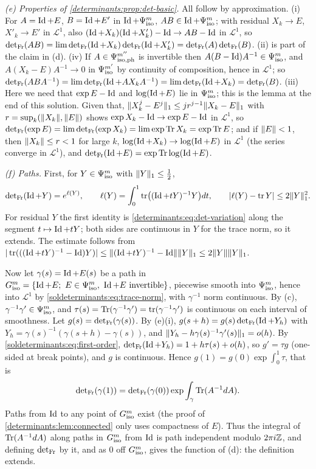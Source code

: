 \emph{(e) Properties of \cref{determinants:prop:det-basic}.} All follow by approximation. (i) For
$A=\operatorname{Id}+E$, $B=\operatorname{Id}+E'$ in $\operatorname{Id}+\Psi^{m}_{\mathrm{iso}}$, $AB\in\operatorname{Id}+\Psi^{m}_{\mathrm{iso}}$; with residual $X_k\to E$, $X'_k\to E'$ in
$\mathcal L^1$, also $(\operatorname{Id}+X_k)(\operatorname{Id}+X_k')-\operatorname{Id}\to AB-\operatorname{Id}$ in $\mathcal L^1$, so
$\operatorname{det}_{\mathrm{Fr}}(AB)=\lim\operatorname{det}_{\mathrm{Fr}}(\operatorname{Id}+X_k)\operatorname{det}_{\mathrm{Fr}}(\operatorname{Id}+X_k')=\operatorname{det}_{\mathrm{Fr}}(A)\operatorname{det}_{\mathrm{Fr}}(B)$. (ii) is part of the claim in (d).
(iv) If $A\in\Psi^{m''}_{\mathrm{iso,ph}}$ is invertible then $A(B-\operatorname{Id})A^{-1}\in\Psi^{m}_{\mathrm{iso}}$, and $A(X_k-E)A^{-1}\to0$ in
$\Psi^{m'}_{\mathrm{iso}}$ by continuity of composition, hence in $\mathcal L^1$; so
$\operatorname{det}_{\mathrm{Fr}}(ABA^{-1})=\lim\operatorname{det}_{\mathrm{Fr}}(\operatorname{Id}+AX_kA^{-1})=\lim\operatorname{det}_{\mathrm{Fr}}(\operatorname{Id}+X_k)=\operatorname{det}_{\mathrm{Fr}}(B)$. (iii) Here we need that
$\exp E-\operatorname{Id}$ and $\log(\operatorname{Id}+E)$ lie in $\Psi^{m}_{\mathrm{iso}}$; this is the lemma at the end of this solution. Given
that, $\lVert X_k^j-E^j\rVert_1\le jr^{j-1}\lVert X_k-E\rVert_1$ with $r=\sup_k(\lVert X_k\rVert,\lVert E\rVert)$ shows
$\exp X_k-\operatorname{Id}\to\exp E-\operatorname{Id}$ in $\mathcal L^1$, so
$\operatorname{det}_{\mathrm{Fr}}(\exp E)=\lim\operatorname{det}_{\mathrm{Fr}}(\exp X_k)=\lim\exp\operatorname{Tr} X_k=\exp\operatorname{Tr} E$; and if $\lVert E\rVert<1$, then
$\lVert X_k\rVert\le r<1$ for large $k$, $\log(\operatorname{Id}+X_k)\to\log(\operatorname{Id}+E)$ in $\mathcal L^1$ (the series converge
in $\mathcal L^1$), and $\operatorname{det}_{\mathrm{Fr}}(\operatorname{Id}+E)=\exp\operatorname{Tr}\log(\operatorname{Id}+E)$.

\emph{(f) Paths.} First, for $Y\in\Psi^{m}_{\mathrm{iso}}$ with $\lVert Y\rVert_1\le\frac12$,
\begin{equation}\label{soldeterminants:eq:first-order}
  \operatorname{det}_{\mathrm{Fr}}(\operatorname{Id}+Y)=e^{\ell(Y)},\qquad \ell(Y)=\int_0^1\operatorname{tr}\bigl((\operatorname{Id}+tY)^{-1}Y\bigr)dt,\qquad |\ell(Y)-\operatorname{tr} Y|\le2\lVert Y\rVert_1^2 .
\end{equation}
For residual $Y$ the first identity is \eqref{determinants:eq:det-variation} along the segment
$t\mapsto\operatorname{Id}+tY$; both sides are continuous in $Y$ for the trace norm, so it extends. The estimate
follows from $|\operatorname{tr}(((\operatorname{Id}+tY)^{-1}-\operatorname{Id})Y)|\le\lVert (\operatorname{Id}+tY)^{-1}-\operatorname{Id}\rVert\lVert Y\rVert_1\le2\lVert Y\rVert\lVert Y\rVert_1$.

Now let $\gamma(s)=\operatorname{Id}+E(s)$ be a path in $\Giso m=\{\Id+E;\ E\in\Psiiso m,\ \Id+E\text{ invertible}\}$,
piecewise smooth into $\Psi^{m}_{\mathrm{iso}}$, hence into $\mathcal L^1$ by \eqref{soldeterminants:eq:trace-norm}, with
$\gamma^{-1}$ norm continuous. By (c), $\gamma^{-1}\gamma'\in\Psi^{m}_{\mathrm{iso}}$, and
$\tau(s)=\operatorname{Tr}(\gamma^{-1}\gamma')=\operatorname{tr}(\gamma^{-1}\gamma')$ is continuous on each interval of smoothness. Let
$g(s)=\operatorname{det}_{\mathrm{Fr}}(\gamma(s))$. By (e)(i), $g(s+h)=g(s)\operatorname{det}_{\mathrm{Fr}}(\operatorname{Id}+Y_h)$ with
$Y_h=\gamma(s)^{-1}(\gamma(s+h)-\gamma(s))$, and $\lVert Y_h-h\gamma(s)^{-1}\gamma'(s)\rVert_1=o(h)$. By
\eqref{soldeterminants:eq:first-order}, $\operatorname{det}_{\mathrm{Fr}}(\operatorname{Id}+Y_h)=1+h\tau(s)+o(h)$, so $g'=\tau g$ (one-sided at break
points), and $g$ is continuous. Hence $g(1)=g(0)\exp\int_0^1\tau$, that is
\begin{equation*}
  \operatorname{det}_{\mathrm{Fr}}(\gamma(1))=\operatorname{det}_{\mathrm{Fr}}(\gamma(0))\exp\int_\gamma\operatorname{Tr}(A^{-1}dA).
\end{equation*}
Paths from $\operatorname{Id}$ to any point of $G^{m}_{\mathrm{iso}}$ exist (the proof of \cref{determinants:lem:connected} only uses
compactness of $E$). Thus the integral of $\operatorname{Tr}(A^{-1}dA)$ along paths in $G^{m}_{\mathrm{iso}}$ from $\operatorname{Id}$ is
path independent modulo $2\pi i\mathbb{Z}$, and defining $\operatorname{det}_{\mathrm{Fr}}$ by it, and as $0$ off $G^{m}_{\mathrm{iso}}$, gives the
function of (d): the definition extends.

